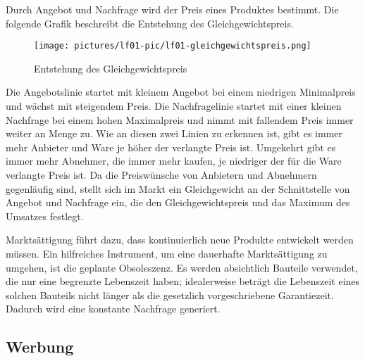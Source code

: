 Durch Angebot und Nachfrage wird der Preis eines Produktes bestimmt. Die folgende Grafik beschreibt die Entstehung des Gleichgewichtspreis.

\begin{wrapfigure}{l}{0.3\textwidth}
	\begin{center}
		\texttt{[image: pictures/lf01-pic/lf01-gleichgewichtspreis.png]}
	\end{center}
	\caption{Entstehung des Gleichgewichtspreis}
\end{wrapfigure}

Die Angebotslinie startet mit kleinem Angebot bei einem niedrigen Minimalpreis und wächst mit steigendem Preis. Die Nachfragelinie startet mit einer kleinen Nachfrage bei einem hohen Maximalpreis und nimmt mit fallendem Preis immer weiter an Menge zu. Wie an diesen zwei Linien zu erkennen ist, gibt es immer mehr Anbieter und Ware je höher der verlangte Preis ist. Umgekehrt gibt es immer mehr Abnehmer, die immer mehr kaufen, je niedriger der für die Ware verlangte Preis ist. Da die Preiswünsche von Anbietern und Abnehmern gegenläufig sind, stellt sich im Markt ein Gleichgewicht an der Schnittstelle von Angebot und Nachfrage ein, die den Gleichgewichtspreis und das Maximum des Umsatzes festlegt.

Marktsättigung führt dazu, dass kontinuierlich neue Produkte entwickelt werden müssen. Ein hilfreiches Instrument, um eine dauerhafte Marktsättigung zu umgehen, ist die geplante Obsoleszenz. Es werden absichtlich Bauteile verwendet, die nur eine begrenzte Lebenszeit haben; idealerweise beträgt die Lebenszeit eines solchen Bauteils nicht länger als die gesetzlich vorgeschriebene Garantiezeit. Dadurch wird eine konstante Nachfrage generiert.


\subsection{Werbung}


